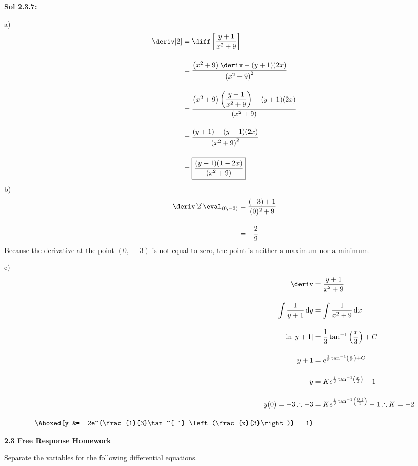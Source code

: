 \begin{tcolorbox}[solution]
    \textbf{Sol 2.3.7: } \par
    a) \begin{align*}
        \deriv[2] &= \diff \left[\dfrac{y + 1}{x^2 + 9}\right] \\[11pt]
        & = \dfrac{\left(x^2 + 9\right)\deriv - (y + 1)(2x)}{\left(x^2 + 9\right)^2} \\[11pt]
        & = \dfrac{\left(x^2 + 9\right)\left(\dfrac{y + 1}{x^2 + 9}\right) - (y + 1)(2x)}{\left(x^2 + 9\right)} \\[11pt]
        & = \dfrac{(y + 1) - (y + 1)(2x)}{\left(x^2 + 9\right)^2} \\[11pt]
        & = \boxed{\dfrac{(y + 1)(1 - 2x)}{\left(x^2 + 9\right)}}
    \end{align*}
    b) \begin{align*}
        \deriv[2] \eval_{(0, -3)} &= \dfrac{(-3) + 1}{(0)^2 + 9} \\[11pt]
        & = -\dfrac{2}{9}
    \end{align*}
    Because the derivative at the point $(0, \, -3)$ is not equal to zero, the point is $\boxed{\text{neither a maximum nor a minimum}}$. \par
    \vspace{11pt}
    c) \begin{align*}
        \deriv &= \dfrac{y + 1}{x^2 + 9} \\[11pt]
        \int \dfrac{1}{y + 1} \,\mathrm{d}y &= \int \dfrac{1}{x^2 + 9} \,\mathrm{d}x \\[11pt]
        \ln |y + 1| &= \dfrac{1}{3}\tan^{-1} \left(\dfrac{x}{3}\right) + C \\[11pt]
        y + 1 &= e^{\frac{1}{3}\tan^{-1} \left(\frac{x}{3}\right) + C} \\[11pt]
        y &= Ke^{\frac{1}{3}\tan^{-1} \left(\frac{x}{3}\right)} - 1 \\[11pt]
        y(0) = -3 \therefore -3 &= Ke^{\frac{1}{3}\tan^{-1} \left(\frac{(0)}{3}\right)} - 1 \therefore K = -2 \\[11pt]
        \Aboxed{y &= -2e^{\frac{1}{3}\tan^{-1} \left(\frac{x}{3}\right)} - 1}
    \end{align*} 
\end{tcolorbox} 

\newpage

\textbf{\large{2.3 Free Response Homework}} \par

Separate the variables for the following differential equations. \par

